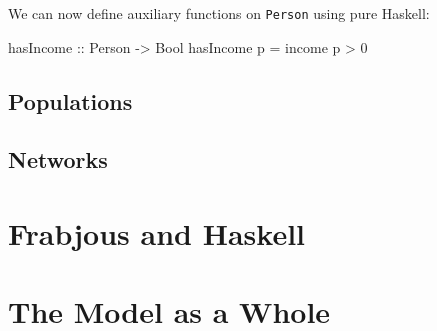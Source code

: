 \documentclass{article}
\begin{document}
We can now define auxiliary functions on \lstinline{Person} using pure Haskell: 

\begin{code}
hasIncome :: Person -> Bool
hasIncome p = income p > 0
\end{code}



\subsection{Populations}


\subsection{Networks}
\label{network}














\section{Frabjous and Haskell}
\label{FrabjousAndHaskell}
\section{The Model as a Whole}
\end{document}
